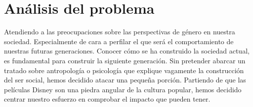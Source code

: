 \noindent %
\chapter{Análisis del problema} 
\noindent
Atendiendo a las preocupaciones sobre las perspectivas de género en nuestra sociedad. Especialmente de cara a perfilar el que será el comportamiento de nuestras futuras generaciones. Conocer cómo se ha construido la sociedad actual, es fundamental para construir la siguiente generación. Sin pretender abarcar un tratado sobre antropología o psicología que explique vagamente la construcción del ser social, hemos decidido atacar una pequeña porción.
Partiendo de que las películas Disney son una piedra angular de la cultura popular, hemos decidido centrar nuestro esfuerzo en comprobar el impacto que pueden tener.